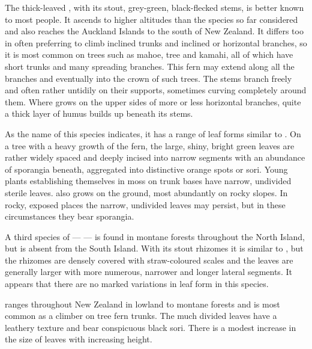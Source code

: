 The thick-leaved , with its stout, grey-green, black-flecked stems, is better known to most people.
It ascends to higher altitudes than the species so far considered and also reaches the Auckland Islands to the south of New Zealand.
It differs too in often preferring to climb inclined trunks and inclined or horizontal branches, so it is most common on trees such as mahoe, tree  and kamahi, all of which have short trunks and many spreading branches.
This fern may extend along all the branches and eventually into the crown of such trees.
The stems branch freely and often rather untidily on their supports, sometimes curving completely around them.
Where  grows on the upper sides of more or less horizontal branches, quite a thick layer of humus builds up beneath its stems.

As the name of this species indicates, it has a range of leaf forms similar to .
On a tree with a heavy growth of the fern, the large, shiny, bright green leaves are rather widely spaced and deeply incised into narrow segments with an abundance of sporangia beneath, aggregated into distinctive orange spots or sori.
Young plants establishing themselves in moss on trunk bases have narrow, undivided sterile leaves.  also grows on the ground, most abundantly on rocky slopes.
In rocky, exposed places the narrow, undivided leaves may persist, but in these circumstances they bear sporangia.

A third species of  ---  --- is found in montane forests throughout the North Island, but is absent from the South Island.
With its stout rhizomes it is similar to , but the rhizomes are densely covered with straw-coloured scales and the leaves are generally larger with more numerous, narrower and longer lateral segments.
It appears that there are no marked variations in leaf form in this species.

 ranges throughout New Zealand in lowland to montane forests and is most common as a climber on tree fern trunks.
The much divided leaves have a leathery texture and bear conspicuous black sori.
There is a modest increase in the size of leaves with increasing height.

